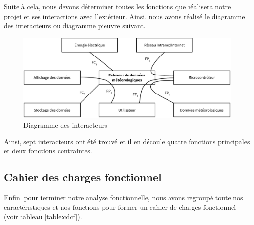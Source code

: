 Suite à cela, nous devons déterminer toutes les fonctions que réalisera notre projet et ses interactions avec l'extérieur. Ainsi, nous avons réalisé le diagramme des interacteurs ou diagramme \og pieuvre \fg{} suivant.

\begin{figure}[!h]
	\centering
	\includegraphics[width=\linewidth]{Images/Diagramme_pieuvre}
	\caption{Diagramme des interacteurs}
\end{figure}

Ainsi, sept interacteurs ont été trouvé et il en découle quatre fonctions principales et deux fonctions contraintes.

\subsection{Cahier des charges fonctionnel}

Enfin, pour terminer notre analyse fonctionnelle, nous avons regroupé toute nos caractéristiques et nos fonctions pour former un cahier de charges fonctionnel (voir tableau \ref{table:cdcf}).

